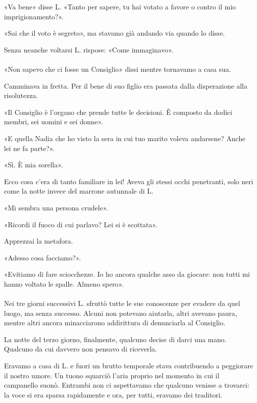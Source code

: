 \documentclass[a4paper,12pt]{book}
\begin{document}
«Va bene» disse L. «Tanto per sapere, tu hai votato a favore o contro il mio
imprigionamento?».

«Sai che il voto è segreto», ma stavamo già andando via quando lo disse.

Senza neanche voltarsi L. rispose: «Come immaginavo».

\paragraph{}
«Non sapevo che ci fosse un Consiglio» dissi mentre tornavamo a casa sua.

Camminava in fretta. Per il bene di suo figlio era passata dalla disperazione
alla risolutezza.

«Il Consiglio è l'organo che prende tutte le decisioni. È composto da dodici
membri, sei uomini e sei donne».

«E quella Nadia che ho visto la sera in cui tuo marito voleva andarsene? Anche
lei ne fa parte?».

«Sì. È mia sorella».

Ecco cosa c'era di tanto familiare in lei! Aveva gli stessi occhi penetranti,
solo neri come la notte invece del marrone autunnale di L.

«Mi sembra una persona crudele».

«Ricordi il fuoco di cui parlavo? Lei si è scottata».

Apprezzai la metafora.

«Adesso cosa facciamo?».

«Evitiamo di fare sciocchezze. Io ho ancora qualche asso da giocare: non tutti
mi hanno voltato le spalle. Almeno spero».

\paragraph{}
Nei tre giorni successivi L. sfruttò tutte le sue conoscenze per evadere da quel
luogo, ma senza successo. Alcuni non potevano aiutarla, altri avevano paura,
mentre altri ancora minacciarono addirittura di denunciarla al Consiglio.

La notte del terzo giorno, finalmente, qualcuno decise di darci una mano.
Qualcuno da cui davvero non pensavo di riceverla.

Eravamo a casa di L. e fuori un brutto temporale stava contribuendo a peggiorare
il nostro umore. Un tuono squarciò l'aria proprio nel momento in cui il
campanello suonò. Entrambi non ci aspettavamo che qualcuno venisse a trovarci:
la voce si era sparsa rapidamente e ora, per tutti, eravamo dei traditori.
\end{document}
